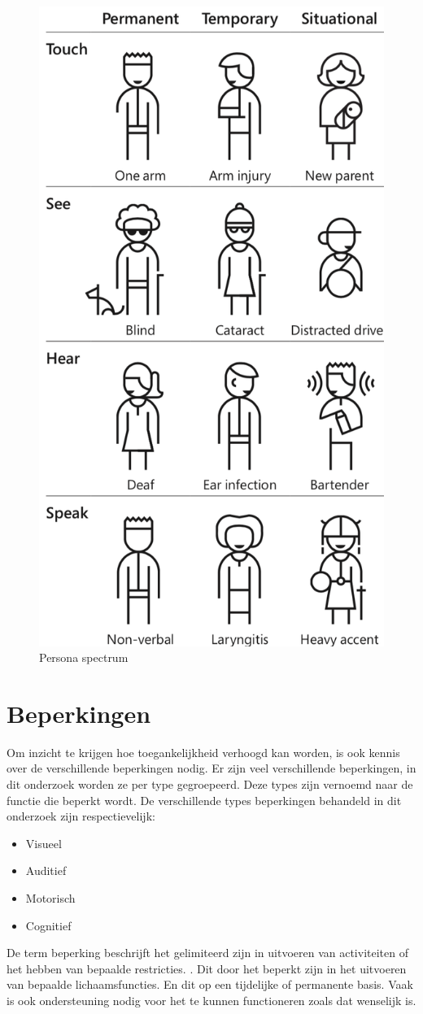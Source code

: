 \begin{figure}[h]
    \centering
    \includegraphics[width=0.4\linewidth]{img/doelgroep_situatie_tijdelijk}
    \caption{Persona spectrum \autocite{inclusiveMicrosoft}}
\end{figure}





\section{Beperkingen}
\label{sec:beperkingen}
Om inzicht te krijgen hoe toegankelijkheid verhoogd kan worden, is ook kennis over de verschillende beperkingen nodig. Er zijn veel verschillende beperkingen, in dit onderzoek worden ze per type gegroepeerd. Deze types zijn vernoemd naar de functie die beperkt wordt.
De verschillende types beperkingen behandeld in dit onderzoek zijn respectievelijk: 
\begin{itemize}
    \item Visueel
    \item Auditief
     \item Motorisch
     \item Cognitief
    \end{itemize}


De term beperking beschrijft het gelimiteerd zijn in uitvoeren van activiteiten of het hebben van bepaalde restricties. \autocite{whoDis2019}. Dit door het beperkt zijn in het uitvoeren van bepaalde lichaamsfuncties. En dit op een tijdelijke of permanente basis. Vaak is ook ondersteuning nodig voor het te kunnen functioneren zoals dat wenselijk is.

